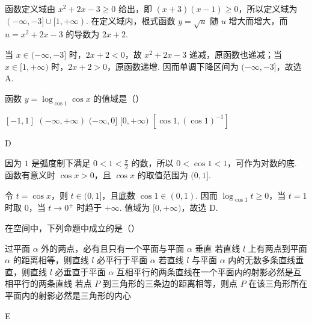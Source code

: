 \documentclass[UTF8,a4paper,oneside,11pt]{ctexbook}
\begin{document}
\begin{solution}
函数定义域由 \(x^2+2x-3\geq0\) 给出，即 \((x+3)(x-1)\geq0\)，所以定义域为 \((-\infty,-3]\cup[1,+\infty)\). 在定义域内，根式函数 \(y=\sqrt{u}\) 随 \(u\) 增大而增大，而 \(u=x^2+2x-3\) 的导数为 \(2x+2\).

当 \(x\in(-\infty,-3]\) 时，\(2x+2<0\)，故 \(x^2+2x-3\) 递减，原函数也递减；当 \(x\in[1,+\infty)\) 时，\(2x+2>0\)，原函数递增. 因而单调下降区间为 \((-\infty,-3]\)，故选 A.
\end{solution}

\begin{problem}

函数 \(y = \log_{\cos 1} \cos x \) 的值域是（\quad）

\choicesfive
    {\([-1,1] \)}
    {\((-\infty,+\infty) \)}
    {\((-\infty,0] \)}
    {\([0,+\infty) \)}
    {\(\left[\cos1,\left(\cos1\right)^{-1}\right] \)}
\end{problem}

\begin{answer}
D
\end{answer}

\begin{solution}
因为 \(1\) 是弧度制下满足 \(0<1<\frac{\pi}{2}\) 的数，所以 \(0<\cos1<1\)，可作为对数的底. 函数有意义时 \(\cos x>0\)，且 \(\cos x\) 的取值范围为 \((0,1]\).

令 \(t=\cos x\)，则 \(t\in(0,1]\)，且底数 \(\cos1\in(0,1)\). 因而 \(\log_{\cos1}t\geq0\)，当 \(t=1\) 时取 \(0\)，当 \(t\to0^+\) 时趋于 \(+\infty\). 值域为 \([0,+\infty)\)，故选 D.
\end{solution}

\begin{problem}

在空间中，下列命题中成立的是（\quad）

\choicesfive
    {过平面 \(\alpha \) 外的两点，必有且只有一个平面与平面 \(\alpha \) 垂直}
    {若直线 \(l\) 上有两点到平面 \(\alpha \) 的距离相等，则直线 \(l\) 必平行于平面 \(\alpha \)}
    {若直线 \(l\) 与平面 \(\alpha \) 内的无数多条直线垂直，则直线 \(l\) 必垂直于平面 \(\alpha \)}
    {互相平行的两条直线在一个平面内的射影必然是互相平行的两条直线}
    {若点 \(P\) 到三角形的三条边的距离相等，则点 \(P\) 在该三角形所在平面内的射影必然是三角形的内心}
\end{problem}

\begin{answer}
E
\end{answer}
\end{document}
